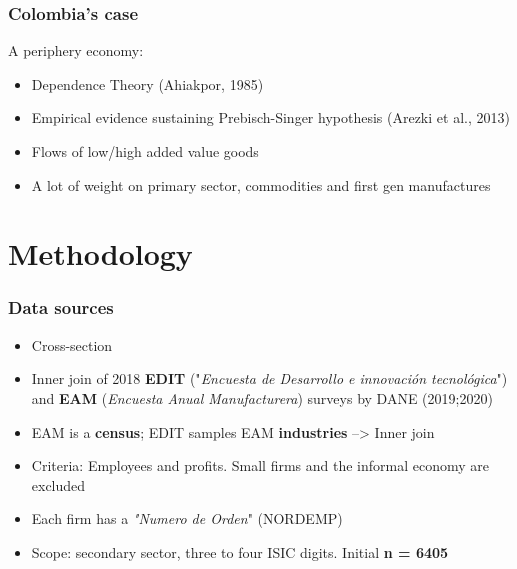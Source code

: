 \documentclass{beamer}
\begin{document}
	\begin{frame}
		\frametitle{Colombia's case}
	A periphery economy:
	\begin{itemize}
		\item Dependence Theory (Ahiakpor, 1985)
		\item Empirical evidence sustaining Prebisch-Singer hypothesis (Arezki et al., 2013)
		\item Flows of low/high added value goods
		\item A lot of weight on primary sector, commodities and first gen manufactures
	\end{itemize}
	\end{frame}
\section{Methodology}
	 \begin{frame}
	 	\frametitle{Data sources}
	 	\begin{itemize}
	 		\item Cross-section
	 		\item Inner join of 2018 \textbf{EDIT} ("\textit{Encuesta de Desarrollo
	 		e innovación tecnológica}") and \textbf{EAM} (\textit{Encuesta Anual Manufacturera}) surveys by DANE (2019;2020)
	 		\item EAM is a \textbf{census}; EDIT samples EAM \textbf{industries} --> Inner join
	 		\item Criteria: Employees and profits. Small firms and the informal economy are excluded
	 		\item Each firm has a \textit{"Numero de Orden}" (NORDEMP)
	 		\item Scope: secondary sector, three to four ISIC digits. Initial \textbf{n = 6405}
	 	\end{itemize}
	 \end{frame}
\end{document}

